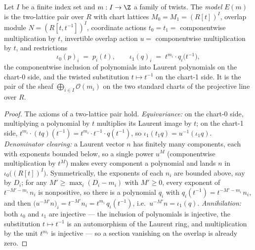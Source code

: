 \begin{definition}
  \label{def:twoLattice_model}
  \leanok
  Let \(I\) be a finite index set and \(m : I \to \Z\) a family of twists. The
  \emph{model} \(E(m)\) is the two-lattice pair over \(R\) with chart lattices
  \(M_0 = M_1 = (R[t])^I\), overlap module \(N = (R[t, t^{-1}])^I\), coordinate actions
  \(t_0 = t_1 =\) componentwise multiplication by \(t\), invertible overlap action
  \(u =\) componentwise multiplication by \(t\), and restrictions
  \[
    \iota_0(p)_i \;=\; p_i(t), \qquad
    \iota_1(q)_i \;=\; t^{m_i} \cdot q_i\bigl(t^{-1}\bigr) ,
  \]
  the componentwise inclusion of polynomials into Laurent polynomials on the chart-0
  side, and the twisted substitution \(t \mapsto t^{-1}\) on the chart-1 side. It is
  the pair of the sheaf \(\bigoplus_{i \in I} \mathcal O(m_i)\) on the two standard
  charts of the projective line over \(R\).
\end{definition}
\begin{proof}
  \leanok
  The axioms of a two-lattice pair hold. \emph{Equivariance:} on the chart-0 side,
  multiplying a polynomial by \(t\) multiplies its Laurent image by \(t\); on the
  chart-1 side, \(t^{m_i} \cdot (t q)(t^{-1}) = t^{m_i} \cdot t^{-1} \cdot q(t^{-1})\),
  so \(\iota_1(t_1 q) = u^{-1}(\iota_1 q)\). \emph{Denominator clearing:} a Laurent
  vector \(n\) has finitely many components, each with exponents bounded below, so a
  single power \(u^M\) (componentwise multiplication by \(t^M\)) makes every component a
  polynomial and lands \(n\) in \(\iota_0\bigl((R[t])^I\bigr)\). Symmetrically, the
  exponents of each \(n_i\) are bounded above, say by \(D_i\); for any
  \(M' \ge \max_i (D_i - m_i)\) with \(M' \ge 0\), every exponent of
  \(t^{-M' - m_i}\, n_i\) is nonpositive, so there is a polynomial \(q_i\) with
  \(q_i(t^{-1}) = t^{-M' - m_i}\, n_i\), and then
  \(\bigl(u^{-M'} n\bigr)_i = t^{-M'} n_i = t^{m_i}\, q_i(t^{-1})\), i.e.\
  \(u^{-M'} n = \iota_1(q)\). \emph{Annihilation:} both
  \(\iota_0\) and \(\iota_1\) are injective --- the inclusion of polynomials is
  injective, the substitution \(t \mapsto t^{-1}\) is an automorphism of the Laurent
  ring, and multiplication by the unit \(t^{m_i}\) is injective --- so a section
  vanishing on the overlap is already zero.
\end{proof}

